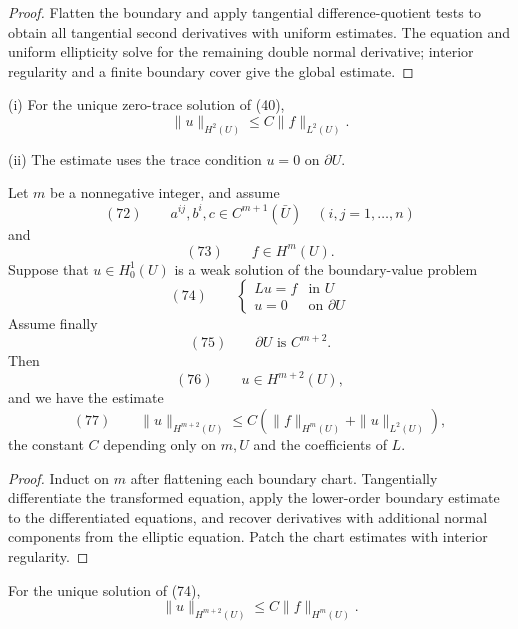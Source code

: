 \begin{proof}
\sketch Flatten the boundary and apply tangential difference-quotient tests to obtain all tangential second derivatives with uniform estimates. The equation and uniform ellipticity solve for the remaining double normal derivative; interior regularity and a finite boundary cover give the global estimate.
\end{proof}

\begin{remark}
\label{rem:boundary-regularity-remarks}

(i) For the unique zero-trace solution of (40),
$$\|u\|_{H^2(U)} \leq C\|f\|_{L^2(U)}.$$

(ii) The estimate uses the trace condition $u=0$ on $\partial U$.
\end{remark}

\begin{theorem}
\label{thm:higher-boundary-regularity}

Let $m$ be a nonnegative integer, and assume
$$(72) \qquad a^{ij}, b^i, c \in C^{m+1}(\bar U) \quad (i,j=1,\ldots,n)$$
and
$$(73) \qquad f \in H^m(U).$$
Suppose that $u \in H_0^1(U)$ is a weak solution of the boundary-value problem
$$(74) \qquad \begin{cases} Lu = f & \text{in } U \\ u = 0 & \text{on } \partial U \end{cases}$$
Assume finally
$$(75) \qquad \partial U \text{ is } C^{m+2}.$$
Then
$$(76) \qquad u \in H^{m+2}(U),$$
and we have the estimate
$$(77) \qquad \|u\|_{H^{m+2}(U)} \leq C(\|f\|_{H^m(U)} + \|u\|_{L^2(U)}),$$
the constant $C$ depending only on $m, U$ and the coefficients of $L$.
\end{theorem}

\begin{proof}
\sketch Induct on $m$ after flattening each boundary chart. Tangentially differentiate the transformed equation, apply the lower-order boundary estimate to the differentiated equations, and recover derivatives with additional normal components from the elliptic equation. Patch the chart estimates with interior regularity.
\end{proof}

\begin{remark}
\label{rem:higher-boundary-regularity-simplified}

For the unique solution of (74),
$$\|u\|_{H^{m+2}(U)} \leq C\|f\|_{H^m(U)}.$$
\end{remark}

